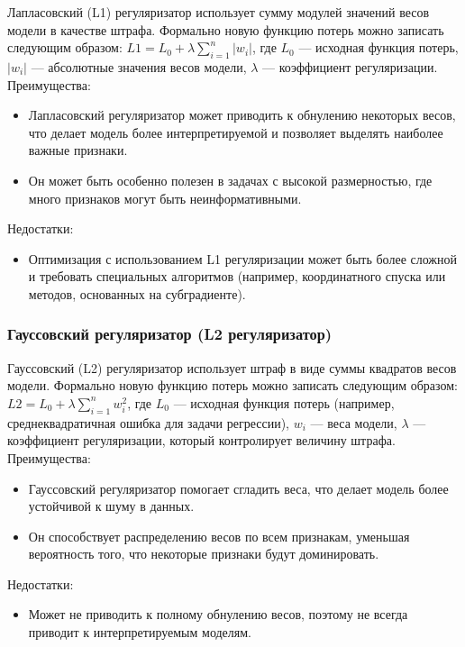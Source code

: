 Лапласовский (L1) регуляризатор использует сумму модулей значений весов модели в качестве штрафа. Формально новую функцию потерь можно записать следующим образом:
$L1 = L_0 + \lambda \sum_{i=1}^{n} |w_i|$,
где $L_0$ --- исходная функция потерь, $|w_i|$ --- абсолютные значения весов модели, $\lambda$ --- коэффициент регуляризации.
\noindent
Преимущества:
\begin{itemize}
	\item Лапласовский регуляризатор может приводить к обнулению некоторых весов, что делает модель более интерпретируемой и позволяет выделять наиболее важные признаки.
	\item Он может быть особенно полезен в задачах с высокой размерностью, где много признаков могут быть неинформативными.
\end{itemize}
Недостатки:
\begin{itemize}
	\item Оптимизация с использованием L1 регуляризации может быть более сложной и требовать специальных алгоритмов (например, координатного спуска или методов, основанных на субградиенте).
\end{itemize}

\subsubsection{Гауссовский регуляризатор (L2 регуляризатор)}

Гауссовский (L2) регуляризатор использует штраф в виде суммы квадратов весов модели. Формально новую функцию потерь можно записать следующим образом:
$L2 = L_0 + \lambda \sum_{i=1}^{n} w_i^2$,
где $L_0$ — исходная функция потерь (например, среднеквадратичная ошибка для задачи регрессии), $w_i$ — веса модели, $\lambda$ — коэффициент регуляризации, который контролирует величину штрафа.
Преимущества:
\begin{itemize}
	\item Гауссовский регуляризатор помогает сгладить веса, что делает модель более устойчивой к шуму в данных.
	\item Он способствует распределению весов по всем признакам, уменьшая вероятность того, что некоторые признаки будут доминировать.
\end{itemize}
Недостатки:
\begin{itemize}
	\item Может не приводить к полному обнулению весов, поэтому не всегда приводит к интерпретируемым моделям.
\end{itemize}

